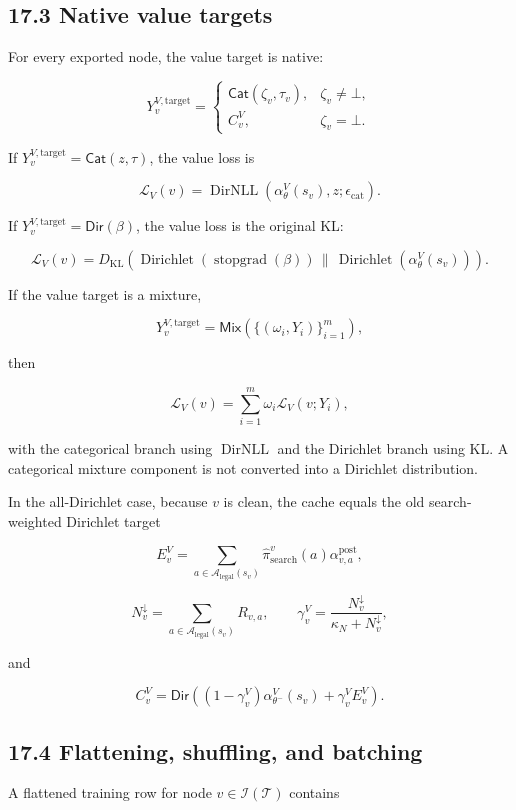 \documentclass[11pt]{article}
\newcommand{\Dir}{\operatorname{Dirichlet}}
\newcommand{\stopgrad}{\operatorname{stopgrad}}
\newcommand{\Tree}{\mathcal{T}}
\newcommand{\Legal}{\mathcal{A}_{\mathrm{legal}}}
\newcommand{\Interior}{\mathcal{I}}
\newcommand{\KL}{D_{\mathrm{KL}}}
\newcommand{\epscat}{\epsilon_{\mathrm{cat}}}
\newcommand{\DirNLL}{\operatorname{DirNLL}}
\newcommand{\DirObj}{\mathsf{Dir}}
\newcommand{\CatObj}{\mathsf{Cat}}
\newcommand{\MixObj}{\mathsf{Mix}}
\begin{document}
\subsection*{17.3 Native value targets}

For every exported node, the value target is native:

\[
Y^{V,\mathrm{target}}_v
=
\begin{cases}
\CatObj(\zeta_v,\tau_v),
& \zeta_v\ne\bot,\\[3pt]
C^V_v,
& \zeta_v=\bot.
\end{cases}
\]

If \(Y^{V,\mathrm{target}}_v=\CatObj(z,\tau)\), the value loss is

\[
\mathcal{L}_V(v)
=
\DirNLL(\alpha_\theta^V(s_v),z;\epscat).
\]

If \(Y^{V,\mathrm{target}}_v=\DirObj(\beta)\), the value loss is the original KL:

\[
\mathcal{L}_V(v)
=
\KL
\left(
\Dir
\left(
\stopgrad(\beta)
\right)
\,\|\,
\Dir
\left(
\alpha_\theta^V(s_v)
\right)
\right).
\]

If the value target is a mixture,

\[
Y^{V,\mathrm{target}}_v
=
\MixObj(\{(\omega_i,Y_i)\}_{i=1}^m),
\]

then

\[
\mathcal{L}_V(v)
=
\sum_{i=1}^m\omega_i\mathcal{L}_V(v;Y_i),
\]

with the categorical branch using \(\DirNLL\) and the Dirichlet branch using KL.
A categorical mixture component is not converted into a Dirichlet distribution.

In the all-Dirichlet case, because \(v\) is clean, the cache equals the old
search-weighted Dirichlet target

\[
E^V_v
=
\sum_{a\in\Legal(s_v)}
\hat\pi_{\mathrm{search}}^v(a)
\alpha^{\mathrm{post}}_{v,a},
\]

\[
N^\downarrow_v
=
\sum_{a\in\Legal(s_v)}R_{v,a},
\qquad
\gamma^V_v
=
\frac{N^\downarrow_v}{\kappa_N+N^\downarrow_v},
\]

and

\[
C^V_v
=
\DirObj\left(
(1-\gamma^V_v)\alpha_{\theta^-}^V(s_v)
+
\gamma^V_v E^V_v
\right).
\]

\subsection*{17.4 Flattening, shuffling, and batching}

A flattened training row for node \(v\in\Interior(\Tree)\) contains
\end{document}
